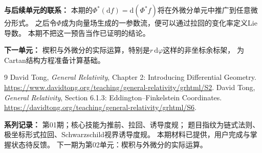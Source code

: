 \documentclass[11pt,a4paper,fontset=fandol]{ctexart}
\newcommand{\dd}{\mathrm{d}}
\begin{document}
\textbf{与后续单元的联系：}
本期的$\Phi^*(\dd f)=\dd(\Phi^*f)$将在外微分单元中推广到任意微分形式。
之后令$\Phi$成为向量场生成的一参数流，便可以通过拉回的变化率定义Lie导数。
本期不把这一预告当作已证明的结论。

\textbf{下一单元：}
楔积与外微分的实际运算，特别是$r\,\dd\varphi$这样的非坐标余标架，
为Cartan结构方程准备计算基础。
\fi

\begin{thebibliography}{9}
 David Tong, \emph{General Relativity},
 Chapter 2: Introducing Differential Geometry.
 \url{https://www.davidtong.org/teaching/general-relativity/grhtml/S2}.
 David Tong, \emph{General Relativity},
 Section 6.1.3: Eddington--Finkelstein Coordinates.
 \url{https://davidtong.org/teaching/general-relativity/grhtml/S6}.
\end{thebibliography}

\noindent\textbf{系列记录：}
第01期；核心技能为推前、拉回、诱导度规；
题目指纹为链式法则、极坐标形式拉回、Schwarzschild视界诱导度规。
本期材料已提供，用户完成与掌握状态待反馈。
下一期为第02单元：楔积与外微分的实际运算。
\end{document}
